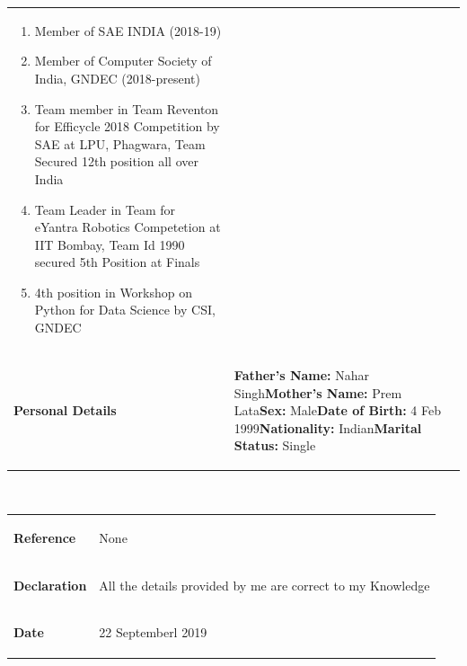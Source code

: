 \documentclass[10pt,doublespace]{article}
\begin{document}
\begin{tabular}{p{3cm}  p{10cm} }
\begin{enumerate}
\item Member of SAE INDIA (2018-19)
\item Member of Computer Society of India, GNDEC (2018-present)
\item Team member in Team Reventon for Efficycle 2018 Competition by SAE at LPU, Phagwara, Team Secured 12th position all over India 
\item Team Leader in Team for eYantra Robotics Competetion at IIT Bombay, Team Id 1990 secured 5th Position at Finals
\item 4th position in Workshop on Python for Data Science by CSI, GNDEC
\end{enumerate}\\
\begin{flushleft} \textbf{Personal Details}\end{flushleft}&
\begin{flushleft} \textbf{Father’s Name:} Nahar Singh\newline \textbf{Mother’s Name:} Prem Lata\newline \textbf{Sex:} Male\newline \textbf{Date of Birth:} 4 Feb 1999\newline \textbf{Nationality:} Indian\newline \textbf{Marital Status:} Single
\end{flushleft}\\
\end{tabular}\\
\begin{tabular}{p{3cm}  p{10cm} }
\begin{flushleft} \textbf{Reference}\end{flushleft}&
\begin{flushleft} None
\end{flushleft}\\
\begin{flushleft} \textbf{Declaration}\end{flushleft}&
\begin{flushleft} All the details provided by me are correct to my Knowledge
\end{flushleft}\\
\begin{flushleft} \textbf{Date}\end{flushleft}&
\begin{flushleft} 22 Septemberl 2019
\end{flushleft}
 \end{tabular}
\end{document}
